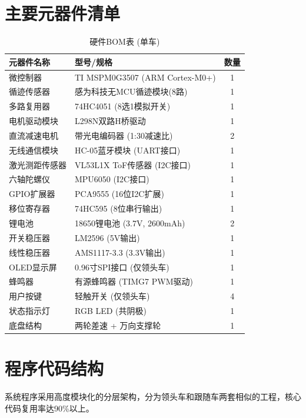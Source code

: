 \documentclass[UTF8]{ctexart}
\begin{document}
\appendix
\section{主要元器件清单}
\begin{table}[H]
    \centering
    \caption{硬件BOM表 (单车)}
    \label{tab:bom}
    \begin{tabular}{llc}
        \toprule
        元器件名称 & 型号/规格 & 数量 \\
        \midrule
        微控制器 & TI MSPM0G3507 (ARM Cortex-M0+) & 1 \\
        循迹传感器 & 感为科技无MCU循迹模块(8路) & 1 \\
        多路复用器 & 74HC4051 (8选1模拟开关) & 1 \\
        电机驱动模块 & L298N双路H桥驱动 & 1 \\
        直流减速电机 & 带光电编码器 (1:30减速比) & 2 \\
        无线通信模块 & HC-05蓝牙模块 (UART接口) & 1 \\
        激光测距传感器 & VL53L1X ToF传感器 (I2C接口) & 1 \\
        六轴陀螺仪 & MPU6050 (I2C接口) & 1 \\
        GPIO扩展器 & PCA9555 (16位I2C扩展) & 1 \\
        移位寄存器 & 74HC595 (8位串行输出) & 1 \\
        锂电池 & 18650锂电池 (3.7V, 2600mAh) & 2 \\
        开关稳压器 & LM2596 (5V输出) & 1 \\
        线性稳压器 & AMS1117-3.3 (3.3V输出) & 1 \\
        OLED显示屏 & 0.96寸SPI接口 (仅领头车) & 1 \\
        蜂鸣器 & 有源蜂鸣器 (TIMG7 PWM驱动) & 1 \\
        用户按键 & 轻触开关 (仅领头车) & 4 \\
        状态指示灯 & RGB LED (共阴极) & 1 \\
        底盘结构 & 两轮差速 + 万向支撑轮 & 1 \\
        \bottomrule
    \end{tabular}
\end{table}

\section{程序代码结构}

系统程序采用高度模块化的分层架构，分为领头车和跟随车两套相似的工程，核心代码复用率达90\%以上。
\end{document}
